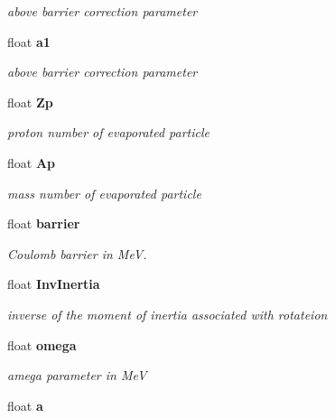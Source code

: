 \begin{CompactItemize}
\begin{CompactList}\small\item\em above barrier correction parameter \item\end{CompactList}\item 
float \bf{a1}\label{classCSigCharged_0f53eb037a0604ef46b9bcd8123bc47a}

\begin{CompactList}\small\item\em above barrier correction parameter \item\end{CompactList}\item 
float \bf{Zp}\label{classCSigCharged_af05329196a8ad846c52c84f8624d05e}

\begin{CompactList}\small\item\em proton number of evaporated particle \item\end{CompactList}\item 
float \bf{Ap}\label{classCSigCharged_3dbeea3317884d86f0b33fc2a0eb403c}

\begin{CompactList}\small\item\em mass number of evaporated particle \item\end{CompactList}\item 
float \bf{barrier}\label{classCSigCharged_93315540bc38507bc5e93fb4a5e2b9e8}

\begin{CompactList}\small\item\em Coulomb barrier in Me\-V. \item\end{CompactList}\item 
float \bf{Inv\-Inertia}\label{classCSigCharged_df7bc08f4b6389120a07f4db07a4edb7}

\begin{CompactList}\small\item\em inverse of the moment of inertia associated with rotateion \item\end{CompactList}\item 
float \bf{omega}\label{classCSigCharged_0a576694df692a880cfd39b99784fa30}

\begin{CompactList}\small\item\em amega parameter in Me\-V \item\end{CompactList}\item 
float \bf{a}\label{classCSigCharged_685b5e0fbca8bfdaf3e4f7eb20ec90a4}


\end{CompactItemize}
